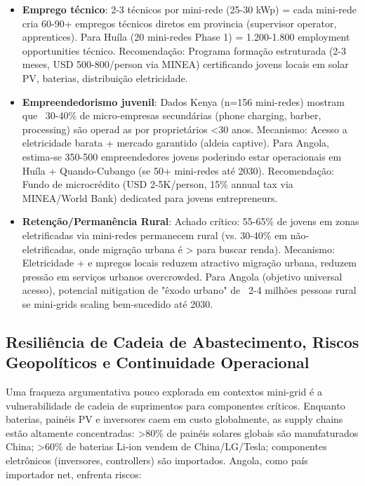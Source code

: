 \documentclass[12pt, a4paper]{article}
\begin{document}
\begin{itemize}
\item \textbf{Emprego técnico}: 2-3 técnicos por mini-rede (25-30 kWp) = cada mini-rede cria 60-90+ empregos técnicos diretos em provincia (supervisor operator, apprentices). Para Huíla (20 mini-redes Phase 1) = 1.200-1.800 employment opportunities técnico. Recomendação: Programa formação estruturada (2-3 meses, USD 500-800/person via MINEA) certificando jovens locais em solar PV, baterias, distribuição eletricidade.

\item \textbf{Empreendedorismo juvenil}:  Dados Kenya (n=156 mini-redes) mostram que ~30-40\% de micro-empresas secundárias (phone charging, barber, processing) são operad as por proprietários <30 anos. Mecanismo: Acesso a eletricidade barata + mercado garantido (aldeia captive). Para Angola, estima-se 350-500 empreendedores jovens poderindo estar operacionais em Huíla + Quando-Cubango (se 50+ mini-redes até 2030). Recomendação: Fundo de microcrédito (USD 2-5K/person, 15\% annual tax via MINEA/World Bank) dedicated para jovens entrepreneurs.

\item \textbf{Retenção/Permanência Rural}: Achado crítico: 55-65\% de jovens em zonas eletrificadas via mini-redes permanecem rural (vs. 30-40\% em não-eletrificadas, onde migração urbana é > para buscar renda). Mecanismo: Eletricidade + e mpregos locais reduzem atractivo migração urbana, reduzem pressão em serviços urbanos overcrowded. Para Angola (objetivo universal acesso), potencial mitigation de "êxodo urbano" de ~2-4 milhões pessoas rural se mini-grids scaling bem-sucedido até 2030.
\end{itemize}

\subsection{Resiliência de Cadeia de Abastecimento, Riscos Geopolíticos e Continuidade Operacional}

Uma fraqueza argumentativa pouco explorada em contextos mini-grid é a vulnerabilidade de cadeia de suprimentos para componentes críticos. Enquanto baterias, painéis PV e inversores caem em custo globalmente, as supply chains estão altamente concentradas: >80\% de painéis solares globais são manufaturados China; >60\% de baterias Li-ion vendem de China/LG/Tesla; componentes eletrônicos (inversores, controllers) são importados. Angola, como país importador net, enfrenta riscos:
\end{document}
